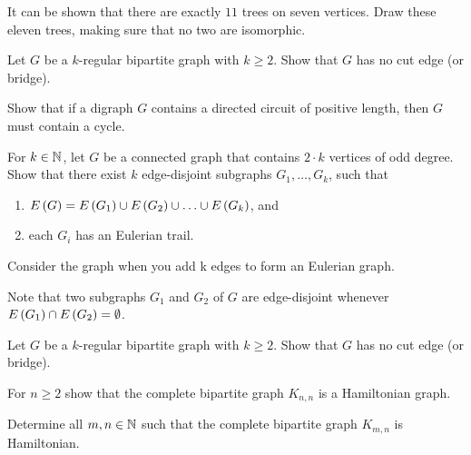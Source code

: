 \documentclass{article}
\begin{document}
\begin{exercise}
It can be shown that there are exactly $11$ trees on seven vertices. Draw these eleven trees, making sure that no two are isomorphic.
\end{exercise}

\begin{exercise}
Let $G$ be a $k$-regular bipartite graph with $k\geq2$. Show that $G$ has no cut edge (or bridge).
\end{exercise}

\begin{exercise}
Show that if a digraph $G$ contains a directed circuit of positive length, then $G$ must contain a cycle.
\end{exercise}

\begin{exercise}
For $k\in\mathbb{N}$, let $G$ be a connected graph that contains $2\cdot k$ vertices of odd degree. Show that there exist $k$ edge-disjoint subgraphs $G_1,\ldots,G_k$, such that
\begin{enumerate}
 \item $E\left( G \right)=E\left( G_1 \right)\cup E\left( G_2 \right)\cup\ldots\cup E\left( G_k \right)$, and
 \item each $G_i$ has an Eulerian trail.
\end{enumerate}
\begin{hint}
Consider the graph when you add k edges to form an Eulerian graph.
\end{hint}
\begin{note}
Note that two subgraphs $G_1$ and $G_2$ of $G$ are edge-disjoint whenever $E\left( G_1 \right)\cap E\left( G_2 \right)=\emptyset$.
\end{note}
\end{exercise}

\begin{exercise}
Let $G$ be a $k$-regular bipartite graph with $k\geq2$. Show that $G$ has no cut edge (or bridge).
\end{exercise}

\begin{exercise}
For $n\geq2$ show that the complete bipartite graph $K_{n,n}$ is a Hamiltonian graph.
\end{exercise}

\begin{exercise}
Determine all $m,n\in\mathbb{N}$ such that the complete bipartite graph $K_{m,n}$ is Hamiltonian.
\end{exercise}
\end{document}

